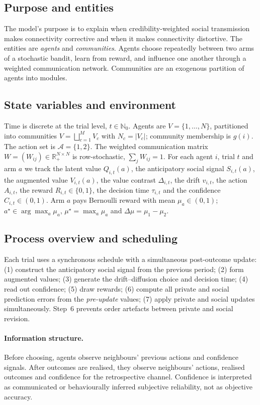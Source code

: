 \documentclass[11pt]{article}
\newcommand{\1}{\mathbf{1}}
\newcommand{\R}{\mathbb{R}}
\newcommand{\Aset}{\mathcal{A}}
\begin{document}
\subsection{Purpose and entities}
The model's purpose is to explain when credibility-weighted social transmission
makes connectivity corrective and when it makes connectivity distortive. The
entities are \emph{agents} and \emph{communities}. Agents choose repeatedly
between two arms of a stochastic bandit, learn from reward, and influence one
another through a weighted communication network. Communities are an exogenous
partition of agents into modules.

\subsection{State variables and environment}
Time is discrete at the trial level, $t\in\mathbb N_0$. Agents are
$V=\{1,\dots,N\}$, partitioned into communities $V=\bigsqcup_{c=1}^M V_c$ with
$N_c=|V_c|$; community membership is $g(i)$. The action set is
$\Aset=\{1,2\}$. The weighted communication matrix
$W=(W_{ij})\in\R_+^{N\times N}$ is row-stochastic, $\sum_j W_{ij}=1$. For each
agent $i$, trial $t$ and arm $a$ we track the latent value $Q_{i,t}(a)$, the
anticipatory social signal $S_{i,t}(a)$, the augmented value $V_{i,t}(a)$, the
value contrast $\Delta_{i,t}$, the drift $v_{i,t}$, the action $A_{i,t}$, the
reward $R_{i,t}\in\{0,1\}$, the decision time $\tau_{i,t}$ and the confidence
$C_{i,t}\in(0,1)$. Arm $a$ pays Bernoulli reward with mean $\mu_a\in(0,1)$;
$a^\star\in\arg\max_a\mu_a$, $\mu^\star=\max_a\mu_a$ and $\Delta\mu=\mu_1-\mu_2$.

\subsection{Process overview and scheduling}
Each trial uses a synchronous schedule with a simultaneous post-outcome update:
(1) construct the anticipatory social signal from the previous period; (2) form
augmented values; (3) generate the drift--diffusion choice and decision time;
(4) read out confidence; (5) draw rewards; (6) compute all private and social
prediction errors from the \emph{pre-update} values; (7) apply private and
social updates simultaneously. Step~6 prevents order artefacts between private
and social revision.

\paragraph{Information structure.}
Before choosing, agents observe neighbours' previous actions and confidence
signals. After outcomes are realised, they observe neighbours' actions, realised
outcomes and confidence for the retrospective channel. Confidence is interpreted
as communicated or behaviourally inferred subjective reliability, not as
objective accuracy.
\end{document}
